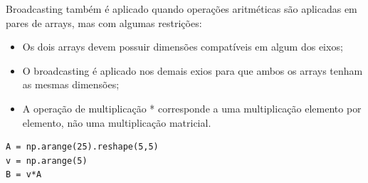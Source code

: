 \documentclass[../numerical_methods.tex]{subfiles}
\begin{document}
Broadcasting também é aplicado quando operações aritméticas são aplicadas em pares de arrays, mas com algumas restrições:
\begin{itemize}
	\item Os dois arrays devem possuir dimensões compatíveis em algum dos eixos;
	\item O broadcasting é aplicado nos demais exios para que ambos os arrays tenham as mesmas dimensões;
	\item A operação de multiplicação * corresponde a uma multiplicação elemento por elemento, não uma multiplicação matricial.
\end{itemize}
\begin{verbatim}
A = np.arange(25).reshape(5,5)
v = np.arange(5)
B = v*A
\end{verbatim}
\end{document}

